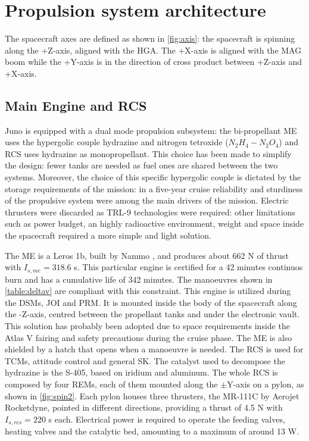 \section{Propulsion system architecture}
\label{sec:prop_architecture}

The spacecraft axes are defined as shown in \autoref{fig:axis}: the spacecraft is spinning along the +Z-axis, aligned with the HGA. The +X-axis is aligned with the MAG boom while the +Y-axis is in the direction of cross product between +Z-axis and +X-axis.


\subsection{Main Engine and RCS}
\label{subsec:me_rcs}

Juno is equipped with a dual mode propulsion subsystem: the bi-propellant ME uses the hypergolic couple hydrazine and nitrogen tetroxide ($N_2H_4 - N_2O_4$) and RCS uses hydrazine as monopropellant. This choice has been made to simplify the design: fewer tanks are needed as fuel ones are shared between the two systems. Moreover, the choice of this specific hypergolic couple is dictated by the storage requirements of the mission: in a five-year cruise reliability and sturdiness of the propulsive system were among the main drivers of the mission. Electric thrusters were discarded as TRL-9 technologies were required: other limitations such as power budget, an highly radioactive environment, weight and space inside the spacecraft required a more simple and light solution. 

The ME is a Leros 1b, built by Nammo \cite{Leros}, and produces about 662 N of thrust with $I_{s,me} = 318.6$ s. This particular engine is certified for a 42 minutes continuos burn and has a cumulative life of 342 minutes. The manoeuvres shown in \autoref{table:deltav} are compliant with this constraint. This engine is utilized during the DSMs, JOI and PRM. It is mounted inside the body of the spacecraft along the -Z-axis, centred between the propellant tanks and under the electronic vault. This solution has probably been adopted due to space requirements inside the Atlas V fairing and safety precautions during the cruise phase. The ME is also shielded by a hatch that opens when a manoeuvre is needed.
The RCS is used for TCMs, attitude control and general SK. The catalyst used to decompose the hydrazine is the S-405, based on iridium and aluminum\cite{s405}.
The whole RCS is composed by four REMs, each of them mounted along the $\pm$Y-axis on a pylon, as shown in \autoref{fig:spin2}. Each pylon houses three thrusters, the MR-111C by Aerojet Rocketdyne\cite{RCS_info}, pointed in different directions, providing a thrust of 4.5 N with $I_{s,rcs} = 220$ s each. Electrical power is required to operate the feeding valves, heating valves and the catalytic bed, amounting to a maximum of around 13 W\cite{RCS_values}. 

